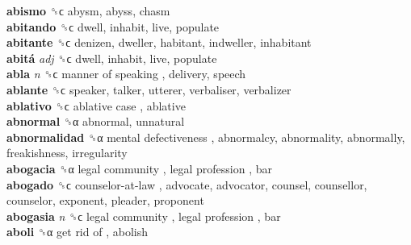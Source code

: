 \textbf{abismo} ␝ϲ  abysm, abyss, chasm  \\
\textbf{abitando} ␝ϲ  dwell, inhabit, live, populate  \\
\textbf{abitante} ␝ϲ  denizen, dweller, habitant, indweller, inhabitant  \\
\textbf{abitá} \emph{adj}  ␝ϲ  dwell, inhabit, live, populate  \\
\textbf{abla} \emph{n}  ␝ϲ   manner of speaking , delivery, speech  \\
\textbf{ablante} ␝ϲ  speaker, talker, utterer, verbaliser, verbalizer  \\
\textbf{ablativo} ␝ϲ   ablative case , ablative  \\
\textbf{abnormal} ␝α  abnormal, unnatural  \\
\textbf{abnormalidad} ␝α   mental defectiveness , abnormalcy, abnormality, abnormally, freakishness, irregularity  \\
\textbf{abogacia} ␝α   legal community ,  legal profession , bar  \\
\textbf{abogado} ␝ϲ   counselor-at-law , advocate, advocator, counsel, counsellor, counselor, exponent, pleader, proponent  \\
\textbf{abogasia} \emph{n}  ␝ϲ   legal community ,  legal profession , bar  \\
\textbf{aboli} ␝α   get rid of , abolish  \\
